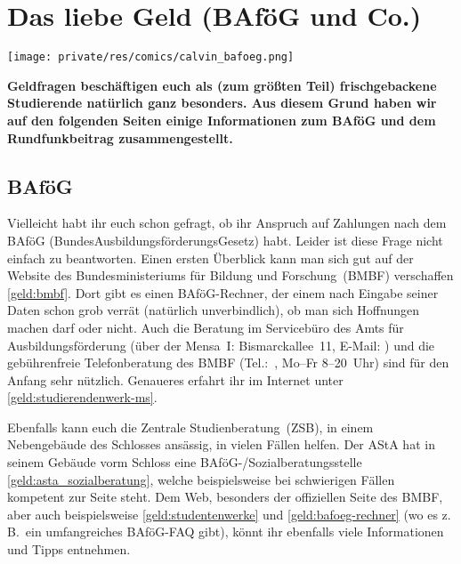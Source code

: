 \section{Das liebe Geld (BAföG und Co.)}

\begin{center}
	\vspace{-0.6cm}
	\texttt{[image: private/res/comics/calvin\_bafoeg.png]}
\end{center}

\begin{multicols*}{2}
\textbf{Geldfragen beschäftigen euch als (zum größten Teil) frischgebackene Studierende natürlich ganz besonders.
Aus diesem Grund haben wir auf den folgenden Seiten einige Informationen zum BAföG und dem Rundfunkbeitrag zusammengestellt.}

\subsection{BAföG}
Vielleicht habt ihr euch schon gefragt, ob ihr Anspruch auf Zahlungen nach dem BAföG (BundesAusbildungsförderungsGesetz) habt.
Leider ist diese Frage nicht einfach zu beantworten.
Einen ersten Überblick kann man sich gut auf der Website des Bundesministeriums für Bildung und Forschung~(BMBF) verschaffen \cref{geld:bmbf}.
Dort gibt es einen BAföG-Rechner, der einem nach Eingabe seiner Daten schon grob verrät (natürlich unverbindlich), ob man sich Hoffnungen machen darf oder nicht.
Auch die Beratung im Servicebüro des Amts für Ausbildungsförderung (über der Mensa~I: Bismarckallee~11, E-Mail: ) und die gebührenfreie Telefonberatung des BMBF (Tel.:~, Mo–Fr 8–20~Uhr) sind für den Anfang sehr nützlich.
Genaueres erfahrt ihr im Internet unter \cref{geld:studierendenwerk-ms}.

Ebenfalls kann euch die Zentrale Studienberatung~(ZSB), in einem Nebengebäude des Schlosses ansässig, in vielen Fällen helfen.
Der AStA hat in seinem Gebäude vorm Schloss eine BAföG-/Sozial\-beratungsstelle \cref{geld:asta_sozialberatung}, welche beispielsweise bei schwierigen Fällen kompetent zur Seite steht.
Dem Web, besonders der offiziellen Seite des BMBF, aber auch beispielsweise \cref{geld:studentenwerke} und \cref{geld:bafoeg-rechner} (wo es z.\,B.\ ein umfangreiches BAföG-FAQ gibt), könnt ihr ebenfalls viele Informationen und Tipps entnehmen.


\end{multicols*}
